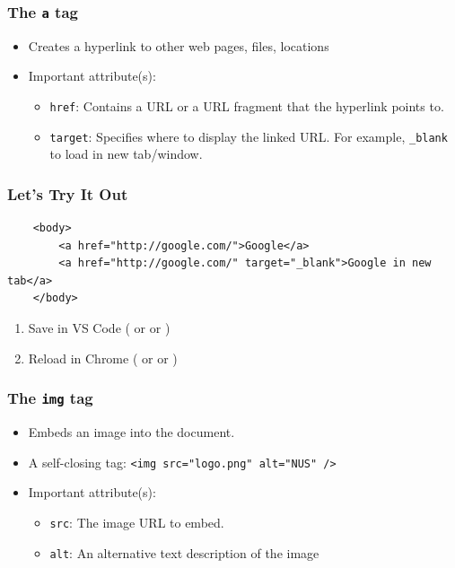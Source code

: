 \documentclass[12pt]{beamer}
\begin{document}
\begin{frame}
\frametitle{The \texttt{a} tag}
\begin{itemize}
	\item Creates a hyperlink to other web pages, files, locations\footnotemark
	\item Important attribute(s):
	\begin{itemize}
		\item \texttt{href}: Contains a URL or a URL fragment that the hyperlink points to.
		\item \texttt{target}: Specifies where to display the linked URL. For example, \texttt{\_blank} to load in new tab/window.
	\end{itemize}
\end{itemize}
\end{frame}

\begin{frame}[fragile]
\frametitle{Let's Try It Out}
\begin{verbatim}
	<body>
		<a href="http://google.com/">Google</a>
		<a href="http://google.com/" target="_blank">Google in new tab</a>
	</body>
\end{verbatim}
\begin{enumerate}
	\item Save in VS Code ( or  or )
	\item Reload in Chrome ( or  or )
\end{enumerate}
\end{frame}

\begin{frame}
\frametitle{The \texttt{img} tag}
\begin{itemize}
	\item Embeds an image into the document.\footnotemark
	\item A self-closing tag: \texttt{<img src="logo.png" alt="NUS" />}
	\item Important attribute(s):
	\begin{itemize}
		\item \texttt{src}: The image URL to embed.
		\item \texttt{alt}: An alternative text description of the image
	\end{itemize}
\end{itemize}
\end{frame}
\end{document}
